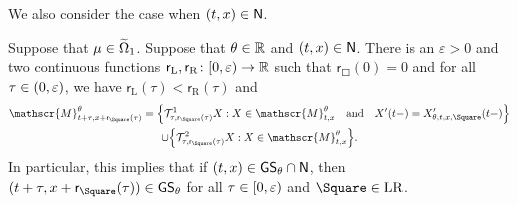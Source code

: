 \documentclass[AHL,Unicode,longabstracts]{cedram}
\newcounter{setofcase}
\newcounter{case}[setofcase]
\newcommand*\GS{\mathsf{GS}}
\newcommand*\ssN{\mathsf{N}}
\newcommand*\sfr{\mathsf{r}}
\newcommand*\scM{\mathscr{M}}
\newcommand*\RR{\mathbb{R}}
\newcommand{\clT}{\mathcal{T}}
\newcommand*\st{\mathrel{:}}
\newcommand*\Left{\mathrm{L}}
\newcommand*\Right{\mathrm{R}}
\newcommand*\LR{\mathrm{LR}}
\newcommand*\eps{\varepsilon}
\renewcommand*{\to}{\mathchoice{\longrightarrow}{\rightarrow}{\rightarrow}{\rightarrow}}
\let\oldin\in
\renewcommand{\in}{\mathchoice{\oldin}{\oldin}{\,\oldin\,}{\,\oldin\,}}
\let\oldcap\cap
\renewcommand{\cap}{\mathchoice{\oldcap}{\oldcap}{\,\oldcap\,}{\,\oldcap\,}}
\let\originalleft\left
\let\originalright\right
\renewcommand{\left}{\mathopen{}\mathclose\bgroup\originalleft}
\renewcommand{\right}{\aftergroup\egroup\originalright}
\newcommand*\RR{\mathbb{R}}
\begin{document}
We also consider the case when $(t,x)\in\ssN$.
\begin{prop}\label{prop:advanceint-N}
Suppose that $\mu\in\widetilde{\Omega}_{1}$. Suppose that $\theta\in\RR$ and $(t,x)\in\ssN$. There is an $\eps>0$ and two continuous functions $\sfr_{\Left},\sfr_{\Right}\colon[0,\eps)\to\RR$ such that $\sfr_{\Square}(0)=0$ and for all $\tau\in(0,\eps)$, we have $\sfr_{\Left}(\tau)<\sfr_{\Right}(\tau)$ and
\begin{multline}\label{eq:usesameminimums-split}
\scM_{t+\tau,x+\sfr_{\Square}(\tau)}^{\theta}  =\left\{ \clT_{\tau,\sfr_{\Square}(\tau)}^{1}X\st X\in\scM_{t,x}^{\theta}\quad\text{and}\quad X'(t-)=X_{\theta,t,x,\Square}'(t-)\right\} \\
\cup\left\{ \clT_{\tau,\sfr_{\Square}(\tau)}^{2}X\st X\in\scM_{t,x}^{\theta}\right\}.
\end{multline}
In particular, this implies that if $(t,x)\in\GS_{\theta}\cap\ssN$, then $(t+\tau,x+\sfr_{\Square}(\tau))\in\GS_{\theta}$ for all $\tau\in[0,\eps)$ and $\Square\in\LR$.
\end{prop}
\end{document}
